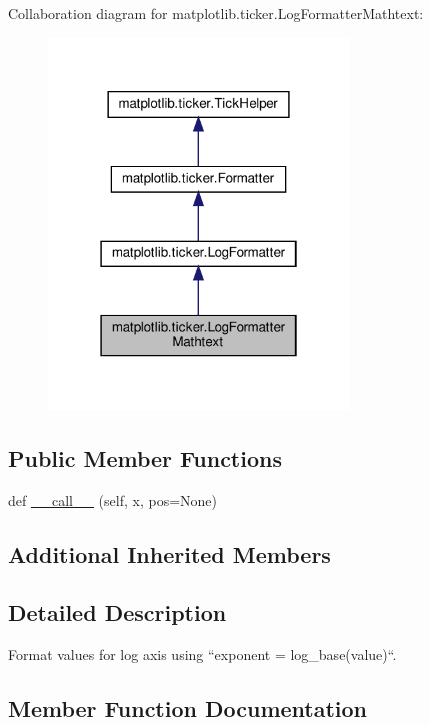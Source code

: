 Collaboration diagram for matplotlib.\+ticker.\+Log\+Formatter\+Mathtext\+:
\nopagebreak
\begin{figure}[H]
\begin{center}
\leavevmode
\includegraphics[width=226pt]{classmatplotlib_1_1ticker_1_1LogFormatterMathtext__coll__graph}
\end{center}
\end{figure}
\subsection*{Public Member Functions}
\begin{DoxyCompactItemize}
\item 
def \hyperlink{classmatplotlib_1_1ticker_1_1LogFormatterMathtext_a01129c0d0ca5aa96c3560c12e9926140}{\+\_\+\+\_\+call\+\_\+\+\_\+} (self, x, pos=None)
\end{DoxyCompactItemize}
\subsection*{Additional Inherited Members}


\subsection{Detailed Description}
\begin{DoxyVerb}Format values for log axis using ``exponent = log_base(value)``.
\end{DoxyVerb}
 

\subsection{Member Function Documentation}
\mbox{\label{classmatplotlib_1_1ticker_1_1LogFormatterMathtext_a01129c0d0ca5aa96c3560c12e9926140}} 
